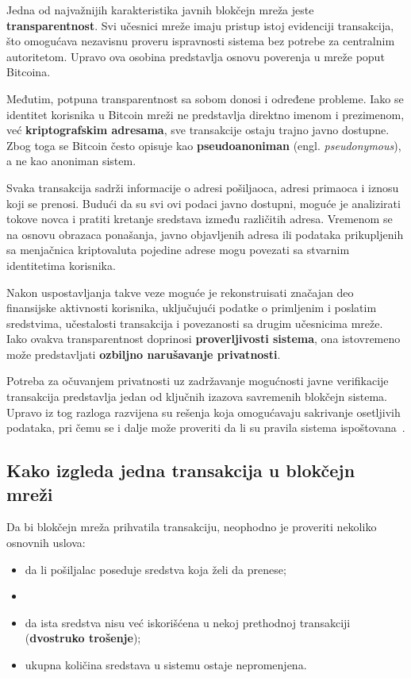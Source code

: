 Jedna od najvažnijih karakteristika javnih blokčejn mreža jeste \textbf{transparentnost}. Svi učesnici mreže imaju pristup istoj evidenciji transakcija, što omogućava nezavisnu proveru ispravnosti sistema bez potrebe za centralnim autoritetom. Upravo ova osobina predstavlja osnovu poverenja u mreže poput Bitcoina.

Međutim, potpuna transparentnost sa sobom donosi i određene probleme. Iako se identitet korisnika u Bitcoin mreži ne predstavlja direktno imenom i prezimenom, već \textbf{kriptografskim adresama}, sve transakcije ostaju trajno javno dostupne. Zbog toga se Bitcoin često opisuje kao \textbf{pseudoanoniman} (engl. \textit{pseudonymous}), a ne kao anoniman sistem.

Svaka transakcija sadrži informacije o adresi pošiljaoca, adresi primaoca i iznosu koji se prenosi. Budući da su svi ovi podaci javno dostupni, moguće je analizirati tokove novca i pratiti kretanje sredstava između različitih adresa. Vremenom se na osnovu obrazaca ponašanja, javno objavljenih adresa ili podataka prikupljenih sa menjačnica kriptovaluta pojedine adrese mogu povezati sa stvarnim identitetima korisnika.

Nakon uspostavljanja takve veze moguće je rekonstruisati značajan deo finansijske aktivnosti korisnika, uključujući podatke o primljenim i poslatim sredstvima, učestalosti transakcija i povezanosti sa drugim učesnicima mreže. Iako ovakva transparentnost doprinosi \textbf{proverljivosti sistema}, ona istovremeno može predstavljati \textbf{ozbiljno narušavanje privatnosti}.

Potreba za očuvanjem privatnosti uz zadržavanje mogućnosti javne verifikacije transakcija predstavlja jedan od ključnih izazova savremenih blokčejn sistema. Upravo iz tog razloga razvijena su rešenja koja omogućavaju sakrivanje osetljivih podataka, pri čemu se i dalje može proveriti da li su pravila sistema ispoštovana~\cite{ganesh2020demystifying}.

\subsection{Kako izgleda jedna transakcija u blokčejn mreži}

Da bi blokčejn mreža prihvatila transakciju, neophodno je proveriti nekoliko osnovnih uslova:

\begin{itemize}
    \item da li pošiljalac poseduje sredstva koja želi da prenese;
    \item \item da ista sredstva nisu već iskorišćena u nekoj prethodnoj transakciji (\textbf{dvostruko trošenje});
    \item ukupna količina sredstava u sistemu ostaje nepromenjena.
\end{itemize}


